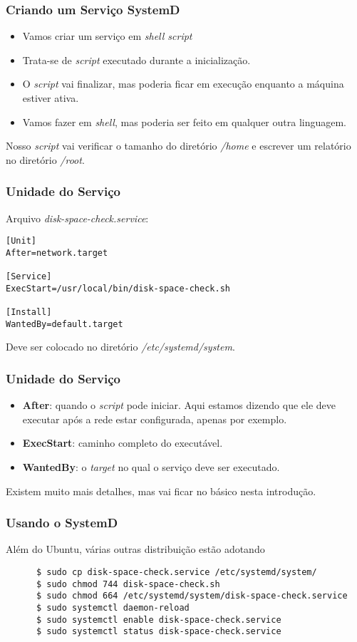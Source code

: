 \documentclass{beamer}
\begin{document}
   \begin{frame}
      \frametitle{Criando um Serviço SystemD}
      \begin{itemize}
          \item Vamos criar um serviço em \textit{shell script} 
	  \item Trata-se de \textit{script} executado durante a inicialização.
          \item O \textit{script} vai finalizar, mas poderia ficar em execução enquanto a máquina estiver ativa.
          \item Vamos fazer em \textit{shell}, mas poderia ser feito em qualquer outra linguagem.
      \end{itemize}
      Nosso \textit{script} vai verificar o tamanho do diretório \textit{/home} e escrever um relatório no diretório \textit{/root}.
   \end{frame}

   \begin{frame}[fragile]
      \frametitle{Unidade do Serviço}
      Arquivo \textit{disk-space-check.service}:
      \begin{verbatim}
[Unit]
After=network.target

[Service]
ExecStart=/usr/local/bin/disk-space-check.sh

[Install]
WantedBy=default.target
      \end{verbatim}
      Deve ser colocado no diretório \textit{/etc/systemd/system}.
\end{frame}

   \begin{frame}
      \frametitle{Unidade do Serviço}
      \begin{itemize}
         \item \textbf{After}: quando o \textit{script} pode iniciar. Aqui estamos dizendo que ele deve executar após a rede estar configurada, apenas por exemplo.	      
         \item \textbf{ExecStart}: caminho completo do executável.
	 \item \textbf{WantedBy}: o \textit{target} no qual o serviço deve ser executado.
      \end{itemize}
      Existem muito mais detalhes, mas vai ficar no básico nesta introdução.
   \end{frame}


   \begin{frame}[fragile]
      \frametitle{Usando o SystemD}
      Além do Ubuntu, várias outras distribuição estão adotando
      \scriptsize
      \begin{verbatim}
      $ sudo cp disk-space-check.service /etc/systemd/system/
      $ sudo chmod 744 disk-space-check.sh
      $ sudo chmod 664 /etc/systemd/system/disk-space-check.service
      $ sudo systemctl daemon-reload
      $ sudo systemctl enable disk-space-check.service
      $ sudo systemctl status disk-space-check.service 
      \end{verbatim}
\end{frame}
\end{document}
